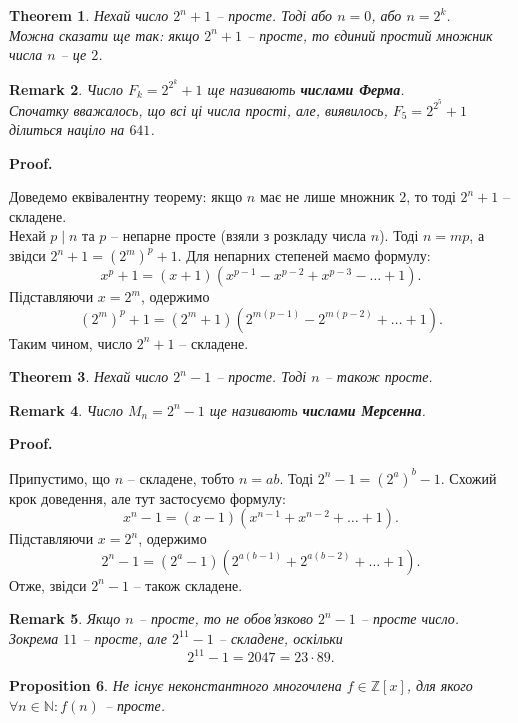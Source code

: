 \documentclass[a4paper, 10pt]{article}
\makeatletter
\theoremstyle{theoremdd}
\newtheorem{theorem}{Theorem}[subsection]
\theoremstyle{theoremdd}
\theoremstyle{theoremdd}
\theoremstyle{theoremdd}
\theoremstyle{theoremdd}
\newtheorem{proposition}[theorem]{Proposition}
\theoremstyle{theoremdd}
\newtheorem{remark}[theorem]{Remark}
\theoremstyle{theoremdd}
\theoremstyle{theoremdd}
\renewenvironment{proof}[1][Proof.\\]{\par
\pushQED{\hfill \qed}%
\normalfont \topsep6\p@\@plus6\p@\relax
\trivlist
\item\relax
{\bfseries
#1\@addpunct{.}}\hspace\labelsep\ignorespaces
}{%
\popQED\endtrivlist\@endpefalse
}
\makeatother
\begin{document}
\begin{theorem}
Нехай число $2^n+1$ -- просте. Тоді або $n = 0$, або $n = 2^k$.\\
Можна сказати ще так: якщо $2^n+1$ -- просте, то єдиний простий множник числа $n$ -- це $2$.
\end{theorem}

\begin{remark}
Число $F_k = 2^{2^k} + 1$ ще називають \textbf{числами Ферма}.\\
Спочатку вважалось, що всі ці числа прості, але, виявилось, $F_5 = 2^{2^5} + 1$ ділиться націло на $641$.
\end{remark}

\begin{proof}
Доведемо еквівалентну теорему: якщо $n$ має не лише множник $2$, то тоді $2^n+1$ -- складене.\\
Нехай $p \mid n$ та $p$ -- непарне просте (взяли з розкладу числа $n$). Тоді $n = mp$, а звідси $2^n+1 = (2^m)^p +1$. Для непарних степеней маємо формулу:
\[
x^p + 1 = (x+1)(x^{p-1} - x^{p-2} + x^{p-3} - \dots + 1).
\]
Підставляючи $x = 2^m$, одержимо
\[
(2^m)^p + 1 = (2^m+1)(2^{m(p-1)} - 2^{m(p-2)} + \dots + 1).
\]
Таким чином, число $2^n + 1$ -- складене.
\end{proof}

\begin{theorem}
Нехай число $2^n - 1$ -- просте. Тоді $n$ -- також просте.
\end{theorem}

\begin{remark}
Число $M_n = 2^n - 1$ ще називають \textbf{числами Мерсенна}.
\end{remark}

\begin{proof}
Припустимо, що $n$ -- складене, тобто $n = ab$. Тоді $2^n - 1 = (2^a)^b - 1$. Схожий крок доведення, але тут застосуємо формулу:
\[
x^n - 1 = (x-1)(x^{n-1}+x^{n-2}+\dots + 1).
\]
Підставляючи $x = 2^n$, одержимо
\[
2^n - 1 = (2^a-1)(2^{a(b-1)} + 2^{a(b-2)} + \dots + 1).
\]
Отже, звідси $2^n-1$ -- також складене.
\end{proof}

\begin{remark}
Якщо $n$ -- просте, то не обов'язково $2^n-1$ -- просте число.\\ Зокрема $11$ -- просте, але $2^{11} - 1$ -- складене, оскільки \[
2^{11}-1 = 2047 = 23 \cdot 89.
\]
\end{remark}

\begin{proposition}
Не існує неконстантного многочлена $f \in \mathbb{Z}[x]$, для якого $\forall n \in \mathbb{N}: f(n)$ -- просте.
\end{proposition}
\end{document}
